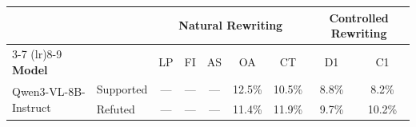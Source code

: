 \begin{tabular}{l l ccccccc}
\toprule
 & & \multicolumn{5}{c}{\textbf{Natural Rewriting}} & \multicolumn{2}{c}{\textbf{Controlled Rewriting}} \\
\cmidrule(lr){3-7} \cmidrule(lr){8-9}
\textbf{Model} & & LP & FI & AS & OA & CT & D1 & C1 \\
\midrule
 \multirow{2}{*}{Qwen3-VL-8B-Instruct} & Supported & --- & --- & --- & \cellcolor{red!25}12.5\% & \cellcolor{red!21}10.5\% & \cellcolor{red!18}8.8\% & \cellcolor{red!16}8.2\% \\
  & Refuted & --- & --- & --- & \cellcolor{red!23}11.4\% & \cellcolor{red!24}11.9\% & \cellcolor{red!19}9.7\% & \cellcolor{red!20}10.2\% \\
\bottomrule
\end{tabular}
